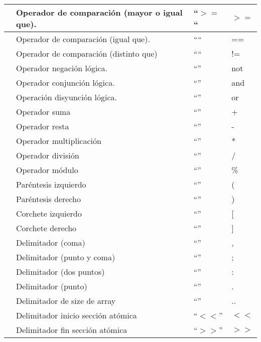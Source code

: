 \begin{longtable}{|c|M{4cm}|M{4cm}|M{2.5cm}|}
\hline
{} & Operador de comparación (mayor o igual que). & ``$>=$`` & $>=$ \\
\hline
{} & Operador de comparación (igual que). & ``\code{==}`` & == \\
\hline
{} & Operador de comparación (distinto que) & ``\code{\!=}`` & != \\
\hline
{} & Operador negación lógica. & ``'' & not \\
\hline
{} & Operador conjunción lógica. & ``'' & and \\
\hline
{} & Operación disyunción lógica. & ``'' & or \\
\hline
{} & Operador suma & ``\code{+}'' & + \\
\hline
{} & Operador resta & ``\code{-}'' & - \\
\hline
{} & Operador multiplicación & ``\code{*}'' & * \\
\hline
{} & Operador división & ``\code{/}'' & / \\
\hline
{} & Operador módulo & ``\code{\%}'' & \% \\
\hline
{} & Paréntesis izquierdo & ``\code{(}'' & ( \\
\hline
{} & Paréntesis derecho & ``\code{)}'' & ) \\
\hline
{} & Corchete izquierdo & ``\code{[}'' & [ \\
\hline
{} & Corchete derecho & ``\code{]}'' & ] \\
\hline
{} & Delimitador (coma) & ``\code{,}'' & , \\
\hline
{} & Delimitador (punto y coma) & ``\code{;}'' & ; \\
\hline
{} & Delimitador (dos puntos) & ``\code{:}'' & : \\
\hline
{} & Delimitador (punto) & ``'' & . \\
\hline
{} & Delimitador de size de array & ``'' & .. \\
\hline
{} & Delimitador inicio sección atómica & ``$<$$<$'' & $<$$<$ \\
\hline
{} & Delimitador fin sección atómica & ``$>$$>$'' & $>$$>$ \\
\hline

\end{longtable}
\renewcommand{\arraystretch}{1.0}

